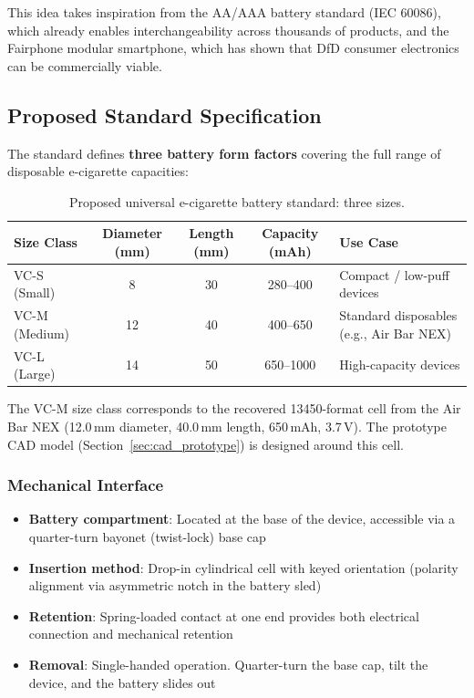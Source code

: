 This idea takes inspiration from the AA/AAA battery standard (IEC 60086), which already enables interchangeability across thousands of products, and the Fairphone modular smartphone, which has shown that DfD consumer electronics can be commercially viable.

\subsection{Proposed Standard Specification}

The standard defines \textbf{three battery form factors} covering the full range of disposable e-cigarette capacities:

\begin{table}[H]
\centering
\caption{Proposed universal e-cigarette battery standard: three sizes.}
\label{tab:battery_standard}
\begin{tabular}{@{}lcccl@{}}
\toprule
\textbf{Size Class} & \textbf{Diameter (mm)} & \textbf{Length (mm)} & \textbf{Capacity (mAh)} & \textbf{Use Case} \\
\midrule
VC-S (Small)   & 8   & 30  & 280--400  & Compact / low-puff devices \\
VC-M (Medium)  & 12  & 40  & 400--650  & Standard disposables (e.g., Air Bar NEX) \\
VC-L (Large)   & 14  & 50  & 650--1000 & High-capacity devices \\
\bottomrule
\end{tabular}
\end{table}

The VC-M size class corresponds to the recovered 13450-format cell from the Air Bar NEX (12.0\,mm diameter, 40.0\,mm length, 650\,mAh, 3.7\,V). The prototype CAD model (Section~\ref{sec:cad_prototype}) is designed around this cell.

\subsubsection{Mechanical Interface}
\begin{itemize}
    \item \textbf{Battery compartment}: Located at the base of the device, accessible via a quarter-turn bayonet (twist-lock) base cap
    \item \textbf{Insertion method}: Drop-in cylindrical cell with keyed orientation (polarity alignment via asymmetric notch in the battery sled)
    \item \textbf{Retention}: Spring-loaded contact at one end provides both electrical connection and mechanical retention
    \item \textbf{Removal}: Single-handed operation. Quarter-turn the base cap, tilt the device, and the battery slides out
\end{itemize}

